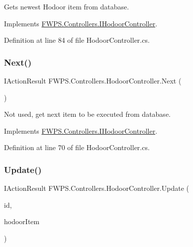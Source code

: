Gets newest Hodoor item from database. 



Implements \mbox{\hyperlink{interface_f_w_p_s_1_1_controllers_1_1_i_hodoor_controller_a39f296accada798a0f161ba8e0ad8777}{F\+W\+P\+S.\+Controllers.\+I\+Hodoor\+Controller}}.



Definition at line 84 of file Hodoor\+Controller.\+cs.

\mbox{\label{class_f_w_p_s_1_1_controllers_1_1_hodoor_controller_ac5008a5159d83bffd779b742bd9e6555}} 
\subsubsection{\texorpdfstring{Next()}{Next()}}
{\footnotesize\ttfamily I\+Action\+Result F\+W\+P\+S.\+Controllers.\+Hodoor\+Controller.\+Next (\begin{DoxyParamCaption}{ }\end{DoxyParamCaption})}



Not used, get next item to be executed from database. 



Implements \mbox{\hyperlink{interface_f_w_p_s_1_1_controllers_1_1_i_hodoor_controller_a106763414af6e583aa8e73c23daeab2e}{F\+W\+P\+S.\+Controllers.\+I\+Hodoor\+Controller}}.



Definition at line 70 of file Hodoor\+Controller.\+cs.

\mbox{\label{class_f_w_p_s_1_1_controllers_1_1_hodoor_controller_a024011e1456e9634e741fdbc30ddd482}} 
\subsubsection{\texorpdfstring{Update()}{Update()}}
{\footnotesize\ttfamily I\+Action\+Result F\+W\+P\+S.\+Controllers.\+Hodoor\+Controller.\+Update (\begin{DoxyParamCaption}\item[{long}]{id,  }\item[{\mbox{[}\+From\+Body\mbox{]} \mbox{\hyperlink{class_f_w_p_s_1_1_models_1_1_hodoor_item}{Hodoor\+Item}}}]{hodoor\+Item }\end{DoxyParamCaption})}



